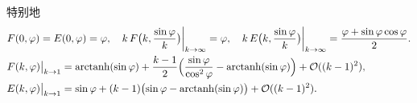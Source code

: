 \normalsize
特别地
\small
\begin{align*}
	F & (0,\varphi)=E(0,\varphi)=\varphi,\quad k\,F\bigl(k,\frac{\sin\varphi}{k}\bigr)\bigg|_{k\to\infty}=\varphi,\quad
	k\,E\bigl(k,\frac{\sin\varphi}{k}\bigr)\bigg|_{k\to\infty}
	=\frac{\varphi+\sin\varphi\cos\varphi}{2}.                                                                          \\
	F & (k,\varphi)\big|_{k\to1}
	=\operatorname{arctanh}(\sin\varphi)
	+\frac{k-1}{2}\Bigl(\frac{\sin\varphi}{\cos^2\varphi}-\operatorname{arctanh}(\sin\varphi)\Bigr)
	+\mathcal{O}((k-1)^2),                                                                                              \\
	E & (k,\varphi)\big|_{k\to1}
	=\sin\varphi+(k-1)\bigl(\sin\varphi-\operatorname{arctanh}(\sin\varphi)\bigr)
	+\mathcal{O}((k-1)^2).
\end{align*}
\normalsize

